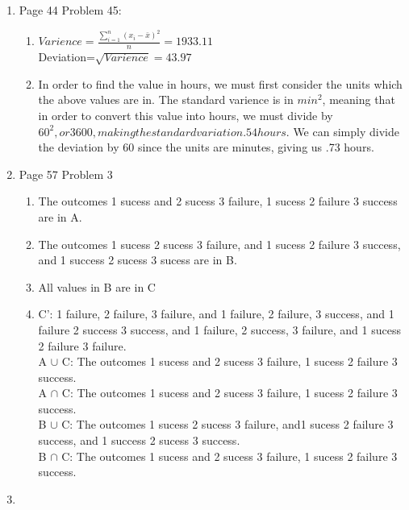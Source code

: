 \documentclass{article}
\begin{document}
\begin{enumerate}
\begin{enumerate}
\end{enumerate}
\item Page 44 Problem 45:
\begin{enumerate}
\item  $Varience=\frac{\sum\limits_{i=1}^n (x_i-\bar{x})^2}{n}=1933.11$\\
Deviation=$\sqrt{Varience}=43.97$
\item In order to find the value in hours, we must first consider the units which the above values are in. The standard varience is in $min^2$, meaning that in order to convert this value into hours, we must divide by $60^2, or 3600, making the standard variation .54 hours$. We can simply divide the deviation by 60 since the units are minutes, giving us .73 hours. 
\end{enumerate}
\item Page 57 Problem 3
\begin{enumerate}
\item The outcomes 1 sucess and 2 sucess 3 failure, 1 sucess 2 failure 3 success are in A.
\item The outcomes 1 sucess 2 sucess 3 failure, and 1 sucess 2 failure 3 success, and 1 success 2 sucess 3 sucess are in B.
\item All values in B are in C
\item C': 1 failure, 2 failure, 3 failure, and 1 failure, 2 failure, 3 success, and 1 failure 2 success 3 success, and 1 failure, 2 success, 3 failure, and 1 sucess 2 failure 3 failure. \\
  A $\cup$ C: The outcomes 1 sucess and 2 sucess 3 failure, 1 sucess 2 failure 3 success. \\
  A $\cap$ C: The outcomes 1 sucess and 2 sucess 3 failure, 1 sucess 2 failure 3 success. \\
  B $\cup$ C: The outcomes 1 sucess 2 sucess 3 failure, and1 sucess 2 failure 3 success, and 1 success 2 sucess 3 success. \\
  B $\cap$ C: The outcomes 1 sucess and 2 sucess 3 failure, 1 sucess 2 failure 3 success.

\end{enumerate}
\item
\begin{center} 
\end{center}
\end{enumerate}
\end{document}
